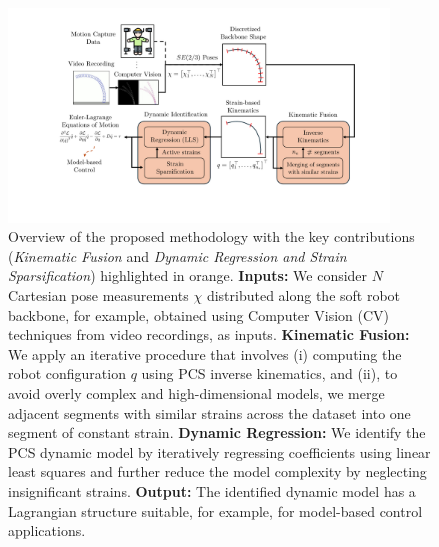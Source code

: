 \begin{figure}[ht]
    \center
    \includegraphics[width=0.9\textwidth]{pcsregression/figures/pcs_regression_overview_v2_cropped.pdf}
    \caption{
        Overview of the proposed methodology with the key contributions (\emph{Kinematic Fusion} and \emph{Dynamic Regression and Strain Sparsification}) highlighted in orange. 
        \textbf{Inputs:} We consider $N$ Cartesian pose measurements $\chi$ distributed along the soft robot backbone, for example, obtained using Computer Vision (CV) techniques from video recordings, as inputs.
        \textbf{Kinematic Fusion:} We apply an iterative procedure that involves (i) computing the robot configuration $q$ using \gls{PCS} inverse kinematics, and (ii), to avoid overly complex and high-dimensional models, we merge adjacent segments with similar strains across the dataset into one segment of constant strain.
        \textbf{Dynamic Regression:} We identify the PCS dynamic model by iteratively regressing coefficients using linear least squares and further reduce the model complexity by neglecting insignificant strains.
        \textbf{Output:} The identified dynamic model has a Lagrangian structure suitable, for example, for model-based control applications.
    }
    \label{fig:pcsregression:overall_diag}
\end{figure}



